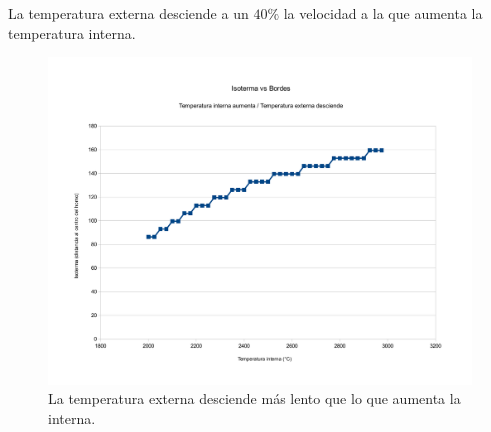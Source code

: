 La temperatura externa desciende a un $40\%$ la velocidad a la que aumenta la temperatura interna.

\begin{figure}[H]{}
\centering
\includegraphics[scale=0.5]{graphs/isotermaVsBordesExternaDesciende.pdf}
\caption{La temperatura externa desciende más lento que lo que aumenta la interna.}
\label{isotermaVsBordesExternaDesciende}
\end{figure}
